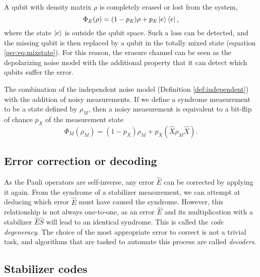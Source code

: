 \begin{definition}\label{def:erasurenoise}
  A qubit with density matrix $\rho$ is completely erased or lost from the system,
  \begin{equation}\label{qec:eq:erasure}
    \Phi_E(\rho) = (1-p_E)\rho + p_E\ket{e}\bra{e},
  \end{equation}
  where the state $\ket{e}$ is outside the qubit space. Such a loss can be detected, and the missing qubit is then replaced by a qubit in the totally mixed state (equation \eqref{qec:eq:mixstate}). For this reason, the erasure channel can be seen as the depolarizing noise model with the additional property that it can detect which qubits suffer the error.
\end{definition}

\begin{definition}\label{def:pheno}
 The combination of the independent noise model (Definition \ref{def:independent}) with the addition of noisy measurements. If we define a syndrome measurement to be a state defined by $\rho_M$, then a noisy measurement is equivalent to a bit-flip of chance $p_X$ of the measurement state
  \begin{equation}\label{eq:pheno}
    \Phi_M(\rho_M)=  (1-p_X)\rho_M + p_X(\hat{X}\rho_M \hat{X}).
  \end{equation}
\end{definition}


\subsection{Error correction or decoding}

As the Pauli operators are self-inverse, any error $\hat{E}$ can be corrected by applying it again. From the syndrome of a stabilizer measurement, we can attempt at deducing which error $\hat{E}$ must have caused the syndrome. However, this relationship is not always one-to-one, as an error $\hat{E}$ and its multiplication with a stabilizer $\hat{E}\hat{S}$ will lead to an identical syndrome. This is called the \emph{code degeneracy}. The choice of the most appropriate error to correct is not a trivial task, and algorithms that are tasked to automate this process are called \emph{decoders}.

\subsection{Stabilizer codes}

